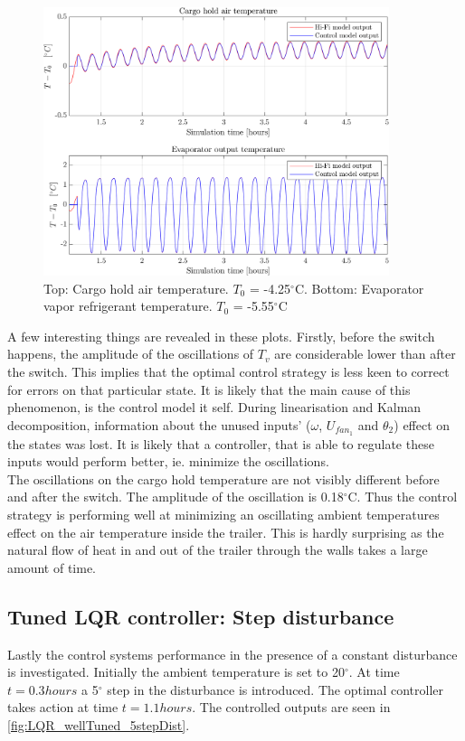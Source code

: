 \begin{figure}[h!]
	\centering
	\includegraphics[width=0.9\textwidth]{Graphics/fig_LQR_wellTuned_sineDist_zoom.png}
	\caption{Top: Cargo hold air temperature. $T_0$ = -4.25$^{\circ}$C. Bottom: Evaporator vapor refrigerant temperature. $T_0$ = -5.55$^{\circ}$C}
	\label{fig:LQR_wellTuned_sineDist_zoom}
\end{figure}

A few interesting things are revealed in these plots. Firstly, before the switch happens, the amplitude of the oscillations of $T_v$ are considerable lower than after the switch. This implies that the optimal control strategy is less keen to correct for errors on that particular state. It is likely that the main cause of this phenomenon, is the control model it self. During linearisation and Kalman decomposition, information about the unused inputs' ($\omega$, $U_{fan_1}$ and $\theta_2$) effect on the states was lost. It is likely that a controller, that is able to regulate these inputs would perform better, ie. minimize the oscillations.\\

The oscillations on the cargo hold temperature are not visibly different before and after the switch. The amplitude of the oscillation is 0.18$^{\circ}$C. Thus the control strategy is performing well at minimizing an oscillating ambient temperatures effect on the air temperature inside the trailer. This is hardly surprising as the natural flow of heat in and out of the trailer through the walls takes a large amount of time. \\


\newpage
\subsection{Tuned LQR controller: Step disturbance}
Lastly the control systems performance in the presence of a constant disturbance is investigated. Initially the ambient temperature is set to 20$^{\circ}$. At time $t=0.3 hours$ a 5$^{\circ}$ step in the disturbance is introduced. The optimal controller takes action at time $t=1.1 hours$. The controlled outputs are seen in \cref{fig:LQR_wellTuned_5stepDist}.\\

